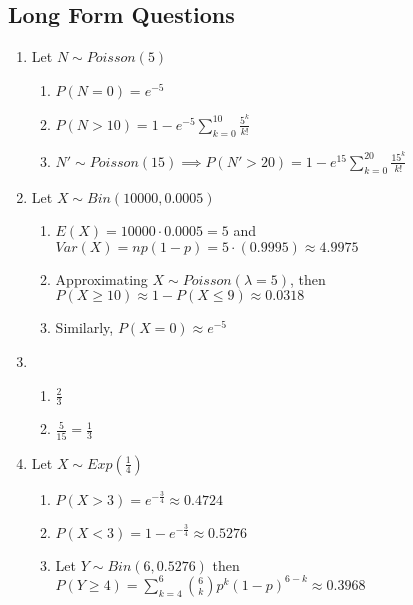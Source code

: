 \documentclass[12pt, a4paper]{article}
\begin{document}
\subsection*{Long Form Questions}
\begin{enumerate}[Q\arabic*.]
  \item Let $N \sim Poisson(5)$ 
    \begin{enumerate}[(\roman*)]
      \item $P(N = 0) = e^{-5}$

      \item $P(N > 10) = 1 - e^{-5}\sum^{10}_{k=0}\frac{5^k}{k!}$

      \item $N' \sim Poisson(15)\implies P(N' > 20) = 1 - e^{15}\sum^{20}_{k=0}\frac{15^k}{k!}$ 
    \end{enumerate}

  \item Let $X \sim Bin(10000, 0.0005)$ 
    \begin{enumerate}[(\roman*)]
      \item $E(X) = 10000\cdot 0.0005 = 5$ and $Var(X) = np(1-p) = 5 \cdot (0.9995) \approx 4.9975$

      \item Approximating $X \sim Poisson(\lambda = 5)$, then $P(X \geq 10) \approx 1 - P(X \leq 9) \approx 0.0318$ 

      \item Similarly, $P(X = 0) \approx e^{-5} $
    \end{enumerate}

  \item 
    \begin{enumerate}[(\roman*)]
      \item $\frac{2}{3}$

      \item $\frac{5}{15} = \frac{1}{3}$ 
    \end{enumerate}

  \item Let $X \sim Exp(\frac{1}{4})$
    \begin{enumerate}[(\roman*)]
      \item $P(X > 3)= e^{-\frac{3}{4}} \approx 0.4724$

      \item $P(X < 3) = 1 - e^{-\frac{3}{4}} \approx 0.5276$

      \item Let $Y \sim Bin(6, 0.5276)$ then $P(Y \geq 4) = \sum^6_{k=4}\binom 6k p^k(1-p)^{6-k} \approx 0.3968$


\end{enumerate}
\end{enumerate}
\end{document}
